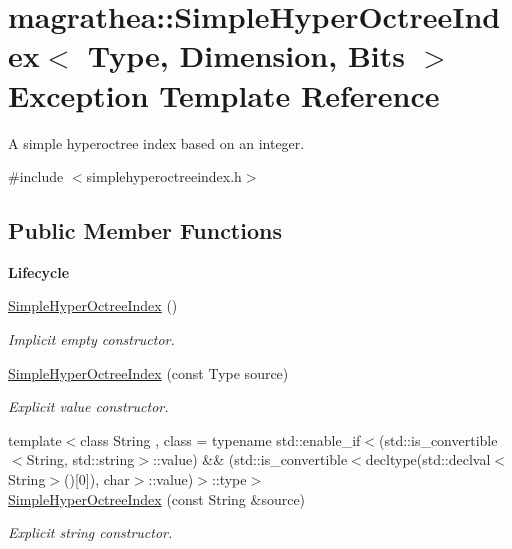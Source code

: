 \hypertarget{exceptionmagrathea_1_1SimpleHyperOctreeIndex}{\section{magrathea\-:\-:Simple\-Hyper\-Octree\-Index$<$ Type, Dimension, Bits $>$ Exception Template Reference}
\label{exceptionmagrathea_1_1SimpleHyperOctreeIndex}
}


A simple hyperoctree index based on an integer.  




{\ttfamily \#include $<$simplehyperoctreeindex.\-h$>$}

\subsection*{Public Member Functions}
\begin{Indent}{\bf Lifecycle}\par
\begin{DoxyCompactItemize}
\item 
\hyperlink{exceptionmagrathea_1_1SimpleHyperOctreeIndex_af1008b3dfe3724ccbe970d4cec9463bf}{Simple\-Hyper\-Octree\-Index} ()
\begin{DoxyCompactList}\small\item\em Implicit empty constructor. \end{DoxyCompactList}\item 
\hyperlink{exceptionmagrathea_1_1SimpleHyperOctreeIndex_aacac508cbc1b3b3bd694d7a69c08b614}{Simple\-Hyper\-Octree\-Index} (const Type source)
\begin{DoxyCompactList}\small\item\em Explicit value constructor. \end{DoxyCompactList}\item 
{\footnotesize template$<$class String , class  = typename std\-::enable\-\_\-if$<$(std\-::is\-\_\-convertible$<$\-String, std\-::string$>$\-::value) \&\& (std\-::is\-\_\-convertible$<$decltype(std\-::declval$<$\-String$>$()\mbox{[}0\mbox{]}), char$>$\-::value)$>$\-::type$>$ }\\\hyperlink{exceptionmagrathea_1_1SimpleHyperOctreeIndex_aeb4c20e736fa7ea33b2b43a7abf12f01}{Simple\-Hyper\-Octree\-Index} (const String \&source)
\begin{DoxyCompactList}\small\item\em Explicit string constructor. \end{DoxyCompactList}\end{DoxyCompactItemize}
\end{Indent}
